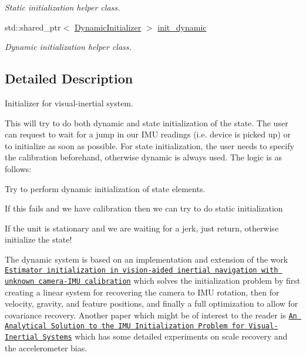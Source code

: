 \begin{DoxyCompactItemize}
\begin{DoxyCompactList}\small\item\em Static initialization helper class. \end{DoxyCompactList}\item 
\mbox{\label{classov__init_1_1InertialInitializer_af35694c9b263ce6e8757b20723aef712}} 
std\+::shared\+\_\+ptr$<$ \hyperlink{classov__init_1_1DynamicInitializer}{Dynamic\+Initializer} $>$ \hyperlink{classov__init_1_1InertialInitializer_af35694c9b263ce6e8757b20723aef712}{init\+\_\+dynamic}
\begin{DoxyCompactList}\small\item\em Dynamic initialization helper class. \end{DoxyCompactList}\end{DoxyCompactItemize}


\subsection{Detailed Description}
Initializer for visual-\/inertial system. 

This will try to do both dynamic and state initialization of the state. The user can request to wait for a jump in our I\+MU readings (i.\+e. device is picked up) or to initialize as soon as possible. For state initialization, the user needs to specify the calibration beforehand, otherwise dynamic is always used. The logic is as follows\+:
\begin{DoxyEnumerate}
\item Try to perform dynamic initialization of state elements.
\item If this fails and we have calibration then we can try to do static initialization
\item If the unit is stationary and we are waiting for a jerk, just return, otherwise initialize the state!
\end{DoxyEnumerate}

The dynamic system is based on an implementation and extension of the work \href{https://ieeexplore.ieee.org/document/6386235}{\tt Estimator initialization in vision-\/aided inertial navigation with unknown camera-\/\+I\+MU calibration} \cite{Dong2012IROS} which solves the initialization problem by first creating a linear system for recovering the camera to I\+MU rotation, then for velocity, gravity, and feature positions, and finally a full optimization to allow for covariance recovery. Another paper which might be of interest to the reader is \href{https://ieeexplore.ieee.org/abstract/document/9462400}{\tt An Analytical Solution to the I\+MU Initialization Problem for Visual-\/\+Inertial Systems} which has some detailed experiments on scale recovery and the accelerometer bias. 

